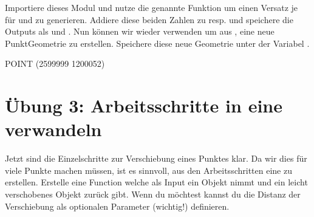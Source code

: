 \documentclass[letterpaper,10pt,english]{sphinxmanual}
\begin{document}
Importiere dieses Modul und nutze die genannte Funktion um einen Versatz je für  und  zu generieren. Addiere diese beiden Zahlen zu  resp.  und speichere die Outputs als  und .
Nun können wir wieder  verwenden um aus ,  eine neue Punkt\sphinxhyphen{}Geometrie zu erstellen. Speichere diese neue Geometrie unter der Variabel .

\begin{sphinxVerbatim}[commandchars=\\\{\}]
  
  

 

    
    

   
\end{sphinxVerbatim}

\begin{sphinxVerbatim}[commandchars=\\\{\}]
POINT (2599999 1200052)
\end{sphinxVerbatim}


\section{Übung 3: Arbeitsschritte in eine  verwandeln}
\label{\detokenize{02_04_Einzelpunkt_Verschieben:ubung-3-arbeitsschritte-in-eine-function-verwandeln}}
Jetzt sind die Einzelschritte zur Verschiebung eines Punktes klar. Da wir dies für viele Punkte machen müssen, ist es sinnvoll, aus den Arbeitsschritten eine  zu erstellen. Erstelle eine Function  welche als Input ein \sphinxhyphen{}Objekt nimmt und ein leicht verschobenes \sphinxhyphen{}Objekt zurück gibt. Wenn du möchtest kannst du die Distanz der Verschiebung als optionalen Parameter (wichtig!) definieren.
\end{document}
